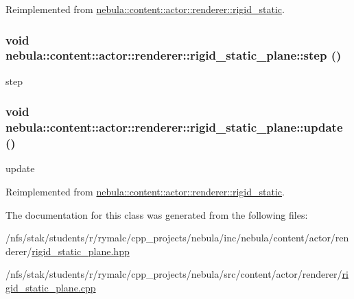 Reimplemented from \hyperlink{classnebula_1_1content_1_1actor_1_1renderer_1_1rigid__static_a33ba501805701c5069344a5126830898}{nebula::content::actor::renderer::rigid\_\-static}.\hypertarget{classnebula_1_1content_1_1actor_1_1renderer_1_1rigid__static__plane_a8afb290e2435e8e1f94776238395d91c}{
\subsubsection[{step}]{\setlength{\rightskip}{0pt plus 5cm}void nebula::content::actor::renderer::rigid\_\-static\_\-plane::step ()}}
\label{classnebula_1_1content_1_1actor_1_1renderer_1_1rigid__static__plane_a8afb290e2435e8e1f94776238395d91c}


step \hypertarget{classnebula_1_1content_1_1actor_1_1renderer_1_1rigid__static__plane_a3ef08d440181a74d4428ebef83607963}{
\subsubsection[{update}]{\setlength{\rightskip}{0pt plus 5cm}void nebula::content::actor::renderer::rigid\_\-static\_\-plane::update ()}}
\label{classnebula_1_1content_1_1actor_1_1renderer_1_1rigid__static__plane_a3ef08d440181a74d4428ebef83607963}


update 

Reimplemented from \hyperlink{classnebula_1_1content_1_1actor_1_1renderer_1_1rigid__static_a3e3b767391a538db88e91035cca7c3dd}{nebula::content::actor::renderer::rigid\_\-static}.

The documentation for this class was generated from the following files:\begin{DoxyCompactItemize}
\item 
/nfs/stak/students/r/rymalc/cpp\_\-projects/nebula/inc/nebula/content/actor/renderer/\hyperlink{renderer_2rigid__static__plane_8hpp}{rigid\_\-static\_\-plane.hpp}\item 
/nfs/stak/students/r/rymalc/cpp\_\-projects/nebula/src/content/actor/renderer/\hyperlink{renderer_2rigid__static__plane_8cpp}{rigid\_\-static\_\-plane.cpp}\end{DoxyCompactItemize}
